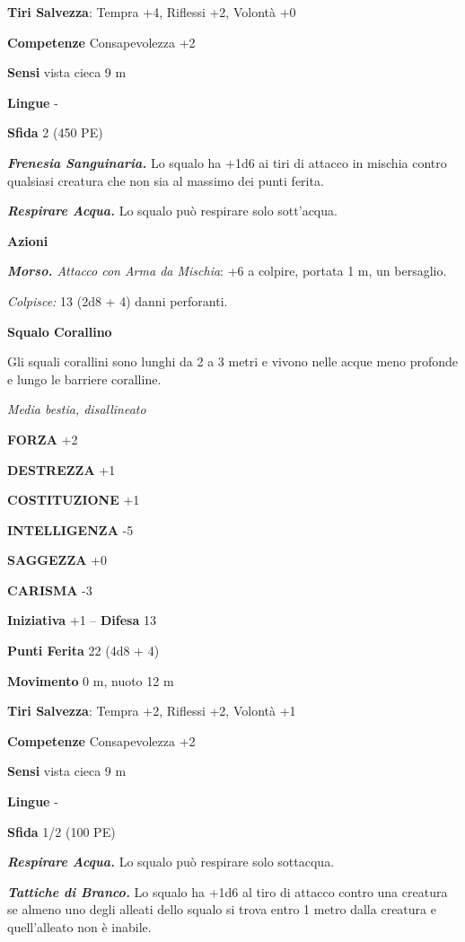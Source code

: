 \begin{multicols}{2}
\textbf{Tiri Salvezza}: Tempra +4, Riflessi +2, Volontà +0

\textbf{Competenze} Consapevolezza +2

\textbf{Sensi} vista cieca 9 m

\textbf{Lingue} -

\textbf{Sfida} 2 (450 PE)

\emph{\textbf{Frenesia Sanguinaria.}} Lo squalo ha +1d6 ai tiri di attacco in mischia contro qualsiasi creatura che non sia al massimo dei punti ferita.

\emph{\textbf{Respirare Acqua.}} Lo squalo può respirare solo sott'acqua.

\textbf{Azioni}

\emph{\textbf{Morso.} Attacco con Arma da Mischia}: +6 a colpire, portata 1 m, un bersaglio.

\emph{Colpisce:} 13 (2d8 + 4) danni perforanti.

\medskip\textbf{Squalo Corallino}

Gli squali corallini sono lunghi da 2 a 3 metri e vivono nelle acque meno profonde e lungo le barriere coralline.

\emph{Media bestia, disallineato}

\textbf{FORZA} +2

\textbf{DESTREZZA} +1

\textbf{COSTITUZIONE} +1

\textbf{INTELLIGENZA} -5

\textbf{SAGGEZZA} +0

\textbf{CARISMA} -3

\textbf{Iniziativa} +1 -- \textbf{Difesa} 13

\textbf{Punti Ferita} 22 (4d8 + 4)

\textbf{Movimento} 0 m, nuoto 12 m

\textbf{Tiri Salvezza}: Tempra +2, Riflessi +2, Volontà +1

\textbf{Competenze} Consapevolezza +2

\textbf{Sensi} vista cieca 9 m

\textbf{Lingue} -

\textbf{Sfida} 1/2 (100 PE)

\emph{\textbf{Respirare Acqua.}} Lo squalo può respirare solo sottacqua.

\emph{\textbf{Tattiche di Branco.}} Lo squalo ha +1d6 al tiro di attacco contro una creatura se almeno uno degli alleati dello squalo si trova entro 1 metro dalla creatura e quell'alleato non è inabile.


\end{multicols}
